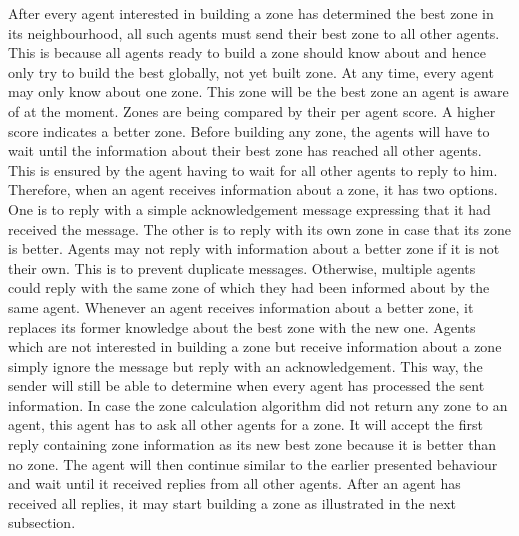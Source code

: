 After every agent interested in building a zone has determined the best zone in its neighbourhood, all such agents must send their best zone to all other agents.
This is because all agents ready to build a zone should know about and hence only try to build the best globally, not yet built zone.
At any time, every agent may only know about one zone.
This zone will be the best zone an agent is aware of at the moment.
Zones are being compared by their per agent score.
A higher score indicates a better zone.
Before building any zone, the agents will have to wait until the information about their best zone has reached all other agents.
This is ensured by the agent having to wait for all other agents to reply to him.
Therefore, when an agent receives information about a zone, it has two options.
One is to reply with a simple acknowledgement message expressing that it had received the message.
The other is to reply with its own zone in case that its zone is better.
Agents may not reply with information about a better zone if it is not their own.
This is to prevent duplicate messages.
Otherwise, multiple agents could reply with the same zone of which they had been informed about by the same agent.
Whenever an agent receives information about a better zone, it replaces its former knowledge about the best zone with the new one.
Agents which are not interested in building a zone but receive information about a zone simply ignore the message but reply with an acknowledgement.
This way, the sender will still be able to determine when every agent has processed the sent information.
In case the zone calculation algorithm did not return any zone to an agent, this agent has to ask all other agents for a zone.
It will accept the first reply containing zone information as its new best zone because it is better than no zone.
The agent will then continue similar to the earlier presented behaviour and wait until it received replies from all other agents.
After an agent has received all replies, it may start building a zone as illustrated in the next subsection. %
